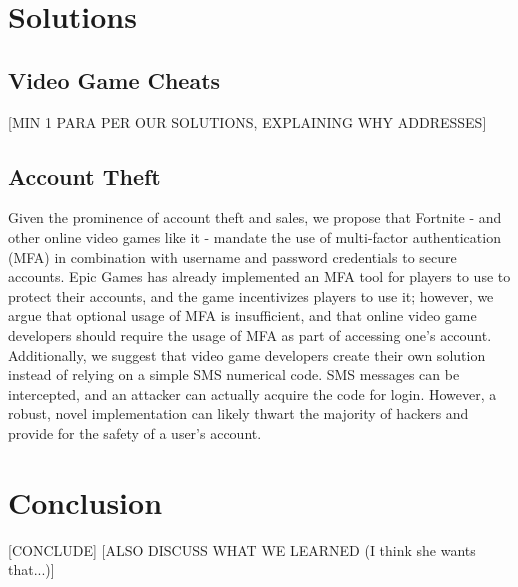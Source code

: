 \documentclass[sigconf]{acmart}
\begin{document}

\section{Solutions}
\subsection{Video Game Cheats}
[MIN 1 PARA PER OUR SOLUTIONS, EXPLAINING WHY ADDRESSES]

\subsection{Account Theft}
Given the prominence of account theft and sales, we propose that Fortnite -
and other online video games like it - mandate the use of multi-factor
authentication (MFA) in combination with username and password credentials to
secure accounts. Epic Games has already implemented an MFA tool for players to 
use to protect their accounts, and the game incentivizes players to use it;
however, we argue that optional usage of MFA is insufficient, and that online 
video game developers should require the usage of MFA as part of accessing one's
account. Additionally, we suggest that video game developers create their own 
solution instead of relying on a simple SMS numerical code. SMS messages can be 
intercepted, and an attacker can actually acquire the code for login. However,
a robust, novel implementation can likely thwart the majority of hackers and 
provide for the safety of a user's account.


\section{Conclusion}
[CONCLUDE]
[ALSO DISCUSS WHAT WE LEARNED (I think she wants that...)]




\end{document}
